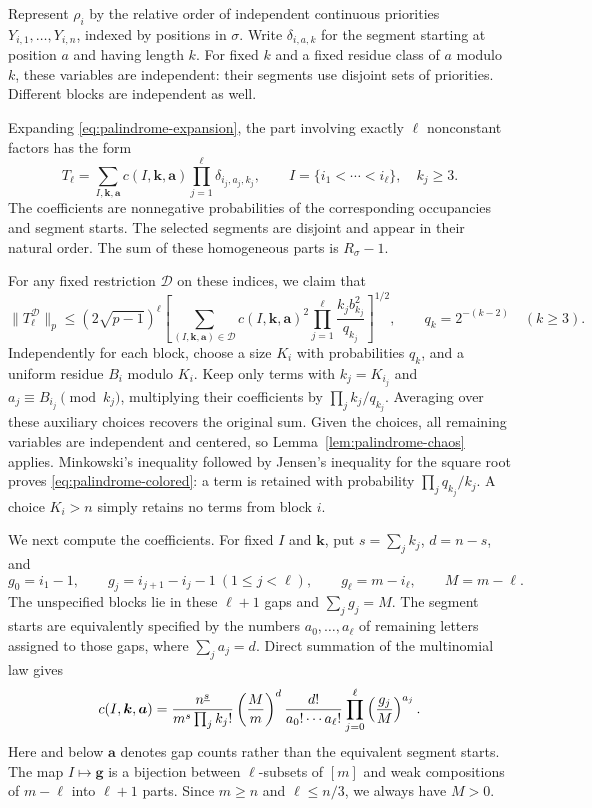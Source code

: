 Represent $\rho_i$ by the relative order of independent continuous
priorities $Y_{i,1},\ldots,Y_{i,n}$, indexed by positions in $\sigma$.
Write $\delta_{i,a,k}$ for the segment starting at position $a$ and
having length $k$.  For fixed $k$ and a fixed residue class of $a$
modulo $k$, these variables are independent: their segments use disjoint
sets of priorities.  Different blocks are independent as well.

Expanding \eqref{eq:palindrome-expansion}, the part involving exactly
$\ell$ nonconstant factors has the form
\[
  T_\ell=\sum_{I,\boldsymbol{k},\boldsymbol{a}}
        c(I,\boldsymbol{k},\boldsymbol{a})
                 \prod_{j=1}^{\ell}\delta_{i_j,a_j,k_j},
  \qquad I=\{i_1<\cdots<i_\ell\},\quad k_j\geq3.
\]
The coefficients are nonnegative probabilities of the corresponding
occupancies and segment starts.  The selected segments are disjoint and
appear in their natural order.  The sum of these homogeneous parts is
$R_\sigma-1$.

For any fixed restriction $\mathcal D$ on these indices, we claim that
\begin{equation}\label{eq:palindrome-colored}
  \|T_\ell^{\mathcal D}\|_p
  \leq(2\sqrt{p-1})^\ell
  \left[
    \sum_{(I,\boldsymbol{k},\boldsymbol{a})\in\mathcal D}
       c(I,\boldsymbol{k},\boldsymbol{a})^2
           \prod_{j=1}^{\ell}\frac{k_jb_{k_j}^2}{q_{k_j}}
  \right]^{1/2},
  \qquad q_k=2^{-(k-2)}\quad(k\geq3).
\end{equation}
Independently for each block, choose a size $K_i$ with probabilities
$q_k$, and a uniform residue $B_i$ modulo $K_i$.  Keep only terms with
$k_j=K_{i_j}$ and $a_j\equiv B_{i_j}\pmod{k_j}$, multiplying their
coefficients by $\prod_j k_j/q_{k_j}$.  Averaging over these auxiliary
choices recovers the original sum.  Given the choices, all remaining
variables are independent and centered, so
Lemma~\ref{lem:palindrome-chaos} applies.  Minkowski's inequality followed
by Jensen's inequality for the square root proves
\eqref{eq:palindrome-colored}: a term is retained with probability
$\prod_jq_{k_j}/k_j$.  A choice $K_i>n$ simply retains no terms from
block $i$.

We next compute the coefficients.  For fixed $I$ and
$\boldsymbol{k}$, put $s=\sum_jk_j$, $d=n-s$, and
\[
  g_0=i_1-1,\qquad
  g_j=i_{j+1}-i_j-1\ (1\leq j<\ell),\qquad
  g_\ell=m-i_\ell,\qquad M=m-\ell.
\]
The unspecified blocks lie in these $\ell+1$ gaps and
$\sum_jg_j=M$.  The segment starts are equivalently specified by the
numbers $a_0,\ldots,a_\ell$ of remaining letters assigned to those gaps,
where $\sum_ja_j=d$.  Direct summation of the multinomial law gives
\begin{equation}\label{eq:palindrome-coefficient}
  c(I,\boldsymbol{k},\boldsymbol{a})
  =\frac{n^{\underline{s}}}{m^s\prod_jk_j!}
      \left(\frac Mm\right)^d
      \frac{d!}{a_0!\cdots a_\ell!}
                     \prod_{j=0}^{\ell}\left(\frac{g_j}{M}\right)^{a_j}.
\end{equation}
Here and below $\boldsymbol a$ denotes gap counts rather than the
equivalent segment starts.  The map $I\mapsto\boldsymbol g$ is a
bijection between $\ell$-subsets of $[m]$ and weak compositions of
$m-\ell$ into $\ell+1$ parts.  Since $m\geq n$ and
$\ell\leq n/3$, we always have $M>0$.

